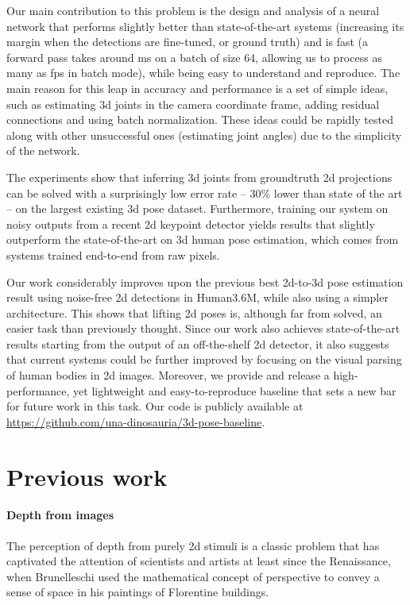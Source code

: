 \documentclass[10pt,twocolumn,letterpaper]{article}
\begin{document}
Our main contribution to this problem is the design and analysis of a neural network that performs slightly better than state-of-the-art systems (increasing its margin when the detections are fine-tuned, or ground truth) and is fast (a forward pass takes around ms on a batch of size 64, allowing us to process as many as  fps in batch mode), while being easy to understand and reproduce. The main reason for this leap in accuracy and performance is a set of simple ideas, such as estimating 3d joints in the camera coordinate frame, adding residual connections and using batch normalization. These ideas could be rapidly tested along with other unsuccessful ones (\eg estimating joint angles) due to the simplicity of the network.

The experiments show that inferring 3d joints from groundtruth 2d projections can be solved with a surprisingly low error rate -- 30\% lower than state of the art -- on the largest existing 3d pose dataset.
Furthermore, training our system on noisy outputs from a recent 2d keypoint detector yields results that 
slightly outperform
the state-of-the-art on 3d human pose estimation, which comes from systems trained end-to-end from raw pixels.

Our work considerably improves upon the previous best 2d-to-3d pose estimation result using noise-free 2d detections in Human3.6M, while also using a simpler architecture. This shows that lifting 2d poses is, although far from solved, an easier task than previously thought.
Since our work also achieves 
state-of-the-art results
starting from the output of an off-the-shelf 2d detector, it also suggests that current systems could be further improved by focusing on the visual parsing of human bodies in 2d images.
Moreover, we provide and release a high-performance, yet lightweight and easy-to-reproduce
baseline that sets a new bar for future work in this task.
Our code is publicly available at \url{https://github.com/una-dinosauria/3d-pose-baseline}.

\section{Previous work}

\paragraph{Depth from images}
The perception of depth from purely 2d stimuli is a classic problem that has captivated the attention of scientists and artists at least since the Renaissance, when Brunelleschi used the mathematical concept of perspective to convey a sense of space in his paintings of Florentine buildings.
\end{document}
